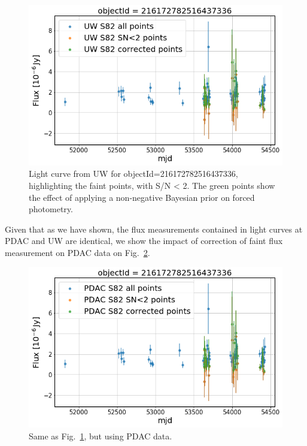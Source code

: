 \documentclass[DM,lsstdraft,toc,usenatbib]{lsstdoc}
\begin{document}
\begin{figure}
\includegraphics[width=\textwidth]{figs/Single_UW_raw_LC_faint_flux}
\caption{Light curve from UW for objectId=216172782516437336, highlighting the faint points, with S/N < 2. The green points show the effect of applying a non-negative Bayesian prior on forced photometry. }
\label{fig:single_faint_flux_UW}
\end{figure}

Given that as we have shown, the flux measurements contained in light curves at PDAC and UW are identical, we show the impact of correction of faint flux measurement on PDAC data on Fig.~\ref{fig:single_faint_flux_PDAC}.  

\begin{figure}
\includegraphics[width=\textwidth]{figs/Single_PDAC_raw_LC_faint_flux}
\caption{Same as Fig.~\ref{fig:single_faint_flux_UW}, but using PDAC data. }
\label{fig:single_faint_flux_PDAC}
\end{figure}
\end{document}
